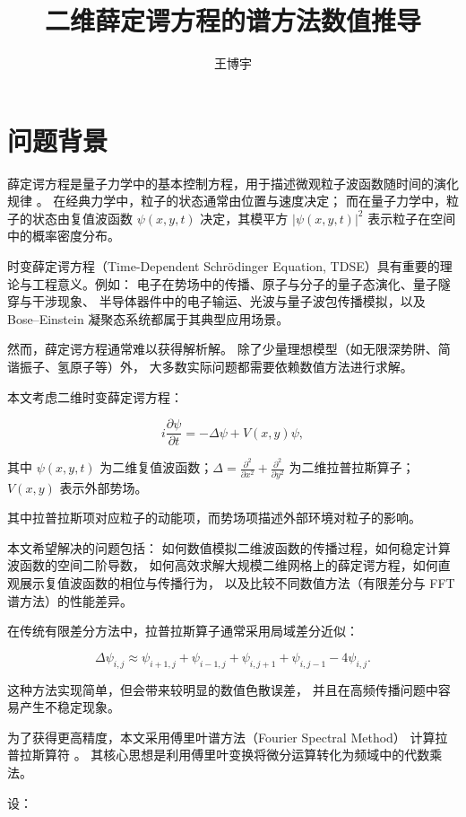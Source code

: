 \documentclass[UTF8,a4paper,12pt]{ctexart}
\title{二维薛定谔方程的谱方法数值推导}
\author{王博宇}
\date{}
\begin{document}
\maketitle

\section{问题背景}

薛定谔方程是量子力学中的基本控制方程，用于描述微观粒子波函数随时间的演化规律
\cite{griffiths,sakurai}。
在经典力学中，粒子的状态通常由位置与速度决定；
而在量子力学中，粒子的状态由复值波函数
$\psi(x,y,t)$
决定，其模平方
$|\psi(x,y,t)|^2$
表示粒子在空间中的概率密度分布。

时变薛定谔方程（Time-Dependent Schrödinger Equation, TDSE）具有重要的理论与工程意义。例如：
电子在势场中的传播、原子与分子的量子态演化、量子隧穿与干涉现象、
半导体器件中的电子输运、光波与量子波包传播模拟，以及 Bose--Einstein 凝聚态系统都属于其典型应用场景。

然而，薛定谔方程通常难以获得解析解。
除了少量理想模型（如无限深势阱、简谐振子、氢原子等）外，
大多数实际问题都需要依赖数值方法进行求解。

本文考虑二维时变薛定谔方程：

\[
i\frac{\partial \psi}{\partial t}
=
-\Delta \psi + V(x,y)\psi,
\]

其中 $ \psi(x,y,t) $ 为二维复值波函数；$
    \Delta
    =
    \frac{\partial^2}{\partial x^2}
    +
    \frac{\partial^2}{\partial y^2} $
为二维拉普拉斯算子；
$ V(x,y) $
表示外部势场。

其中拉普拉斯项对应粒子的动能项，而势场项描述外部环境对粒子的影响。

本文希望解决的问题包括：
如何数值模拟二维波函数的传播过程，如何稳定计算波函数的空间二阶导数，
如何高效求解大规模二维网格上的薛定谔方程，如何直观展示复值波函数的相位与传播行为，
以及比较不同数值方法（有限差分与 FFT 谱方法）的性能差异。

在传统有限差分方法中，拉普拉斯算子通常采用局域差分近似：

\[
\Delta \psi_{i,j}
\approx
\psi_{i+1,j}
+
\psi_{i-1,j}
+
\psi_{i,j+1}
+
\psi_{i,j-1}
-
4\psi_{i,j}.
\]

这种方法实现简单，但会带来较明显的数值色散误差，
并且在高频传播问题中容易产生不稳定现象。

为了获得更高精度，本文采用傅里叶谱方法（Fourier Spectral Method）
计算拉普拉斯算符 \cite{trefethen,boyd}。
其核心思想是利用傅里叶变换将微分运算转化为频域中的代数乘法。

设：
\end{document}
